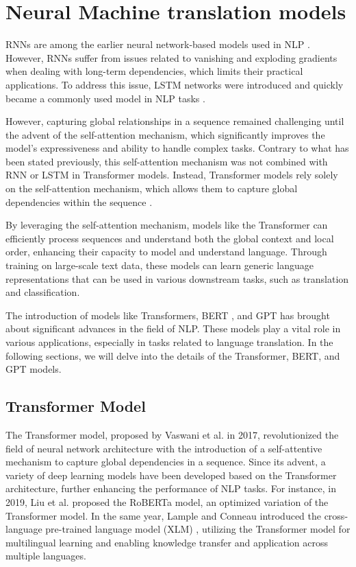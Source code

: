 \documentclass[acmsmall]{acmart}
\begin{document}
\section{Neural Machine translation models}
\label{sec3}
RNNs are among the earlier neural network-based models used in NLP \cite{1-2b1}.  However, RNNs suffer from issues related to vanishing and exploding gradients when dealing with long-term dependencies, which limits their practical applications. To address this issue, LSTM networks were introduced and quickly became a commonly used model in NLP tasks \cite{1-2b2}. 

However, capturing global relationships in a sequence remained challenging until the advent of the self-attention mechanism, which significantly improves the model's expressiveness and ability to handle complex tasks. Contrary to what has been stated previously, this self-attention mechanism was not combined with RNN or LSTM in Transformer models. Instead, Transformer models rely solely on the self-attention mechanism, which allows them to capture global dependencies within the sequence \cite{1-7}.

By leveraging the self-attention mechanism, models like the Transformer can efficiently process sequences and understand both the global context and local order, enhancing their capacity to model and understand language. Through training on large-scale text data, these models can learn generic language representations that can be used in various downstream tasks, such as translation and classification. 

The introduction of models like Transformers, BERT \cite{1-8}, and GPT \cite{1-9} has brought about significant advances in the field of NLP. These models play a vital role in various applications, especially in tasks related to language translation. In the following sections, we will delve into the details of the Transformer, BERT, and GPT models.

\subsection{Transformer Model}%

The Transformer model, proposed by Vaswani et al. \cite{1-7} in 2017, revolutionized the field of neural network architecture with the introduction of a self-attentive mechanism to capture global dependencies in a sequence. Since its advent, a variety of deep learning models have been developed based on the Transformer architecture, further enhancing the performance of NLP tasks. For instance, in 2019, Liu et al. \cite{3-2} proposed the RoBERTa model, an optimized variation of the Transformer model. In the same year, Lample and Conneau introduced the cross-language pre-trained language model (XLM) \cite{conneau2019unsupervised}, utilizing the Transformer model for multilingual learning and enabling knowledge transfer and application across multiple languages.
\end{document}
